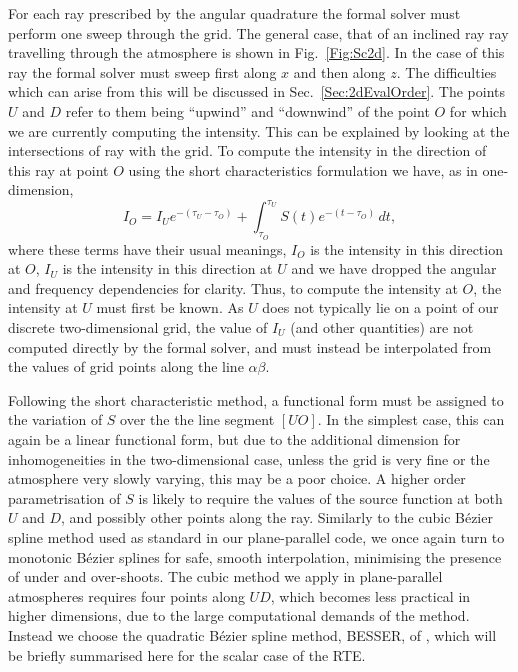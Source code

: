 For each ray prescribed by the angular quadrature the formal solver must perform one sweep through the grid.
The general case, that of an inclined ray ray travelling through the atmosphere is shown in Fig.~\ref{Fig:Sc2d}.
In the case of this ray the formal solver must sweep first along $x$ and then along $z$.
The difficulties which can arise from this will be discussed in Sec.~\ref{Sec:2dEvalOrder}.
The points $U$ and $D$ refer to them being ``upwind'' and ``downwind'' of the point $O$ for which we are currently computing the intensity.
This can be explained by looking at the intersections of ray with the grid.
To compute the intensity in the direction of this ray at point $O$ using the short characteristics formulation we have, as in one-dimension,
\begin{equation}\label{Eq:MiniScDefinition}
   I_O = I_U e^{-(\tau_U - \tau_O)} + \int_{\tau_O}^{\tau_U} S(t) e^{-(t - \tau_O)}\, dt,
\end{equation}
where these terms have their usual meanings, $I_O$ is the intensity in this direction at $O$, $I_U$ is the intensity in this direction at $U$ and we have dropped the angular and frequency dependencies for clarity.
Thus, to compute the intensity at $O$, the intensity at $U$ must first be known.
As $U$ does not typically lie on a point of our discrete two-dimensional grid, the value of $I_U$ (and other quantities) are not computed directly by the formal solver, and must instead be interpolated from the values of grid points along the line $\alpha\beta$.

Following the short characteristic method, a functional form must be assigned to the variation of $S$ over the the line segment $[UO]$.
In the simplest case, this can again be a linear functional form, but due to the additional dimension for inhomogeneities in the two-dimensional case, unless the grid is very fine or the atmosphere very slowly varying, this may be a poor choice.
A higher order parametrisation of $S$ is likely to require the values of the source function at both $U$ and $D$, and possibly other points along the ray.
Similarly to the cubic Bézier spline method used as standard in our plane-parallel code, we once again turn to monotonic Bézier splines for safe, smooth interpolation, minimising the presence of under and over-shoots.
The cubic method we apply in plane-parallel atmospheres requires four points along $UD$, which becomes less practical in higher dimensions, due to the large computational demands of the method.
Instead we choose the quadratic Bézier spline method, BESSER, of \citet{Stepan2013}, which will be briefly summarised here for the scalar case of the RTE.

